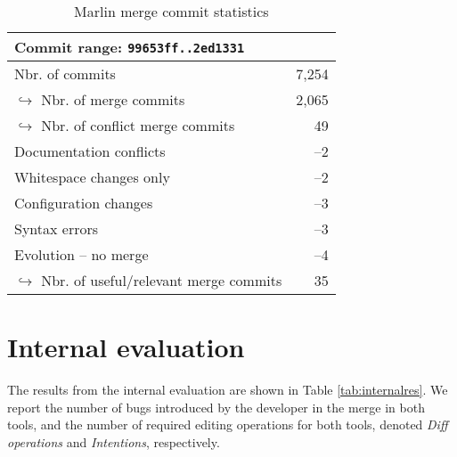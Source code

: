 \begin{table}[h]
    \centering
    \caption{Marlin merge commit statistics}
    \label{tab:marlinmerge}
    \begin{tabular}{l r}
    \hline\hline
        Commit range: \texttt{99653ff..2ed1331}& \\\hline
        Nbr. of commits & 7,254\\
        $\hookrightarrow$ Nbr. of merge commits & 2,065 \\
        \hspace{1em}$\hookrightarrow$ Nbr. of conflict merge commits & 49 \\
        \hspace{1em}Documentation conflicts & --2\\
        \hspace{1em}Whitespace changes only & --2\\
        \hspace{1em}Configuration changes & --3\\
        \hspace{1em}Syntax errors & --3\\
        \hspace{1em}Evolution -- no merge & --4\\
        \hspace{2em}$\hookrightarrow$ Nbr. of useful/relevant merge commits & 35\\
    \hline\hline
    \end{tabular}
\end{table}


\section{Internal evaluation}
The results from the internal evaluation are shown in Table \ref{tab:internalres}. We report the number of bugs introduced by the developer in the merge in both tools, and the number of required editing operations for both tools, denoted \textit{Diff operations} and \textit{Intentions}, respectively. 

